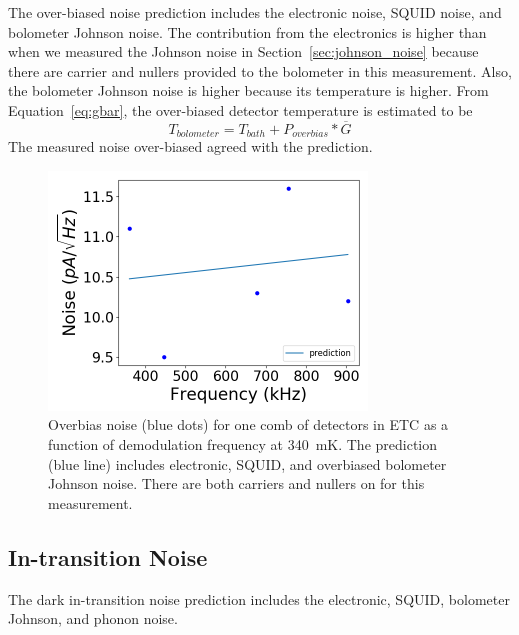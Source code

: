The over-biased noise prediction includes the electronic noise, \ac{SQUID} noise, and bolometer Johnson noise. 
The contribution from the electronics is higher than when we measured the Johnson noise in Section~\ref{sec:johnson_noise} because there are carrier and nullers provided to the bolometer in this measurement. 
Also, the bolometer Johnson noise is higher because its temperature is higher. 
From Equation~\ref{eq:gbar}, the over-biased detector temperature is estimated to be
\begin{equation}
T_{bolometer} = T_{bath} + P_{overbias}* \overline{G}
\end{equation}
The measured noise over-biased agreed with the prediction. 


\begin{figure}[ht!]
\begin{center}
\includegraphics[height=2.5in]{figures/overbias_noise.png}
\caption{Overbias noise (blue dots) for one comb of detectors in \ac{ETC} as a function of demodulation frequency at 340~mK. The prediction (blue line) includes electronic, \ac{SQUID}, and overbiased bolometer Johnson noise. There are both carriers and nullers on for this measurement.
\label{fig:overbias_noise} }
\end{center}
\end{figure}

\subsection{In-transition Noise}
\label{sec:in_transition_noise}

The dark in-transition noise prediction includes the electronic, \ac{SQUID}, bolometer Johnson, and phonon noise. 

